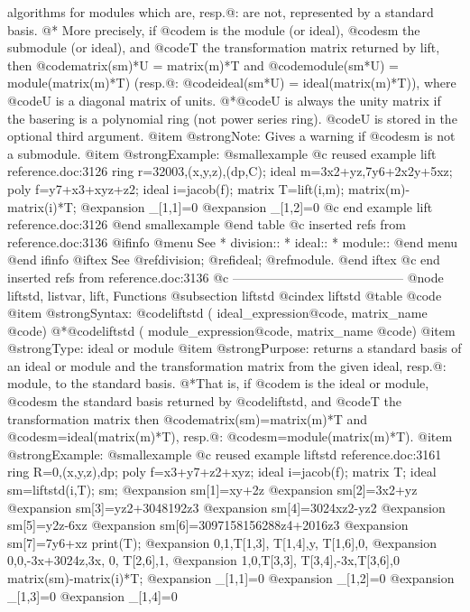 {algorithms for modules which are, resp.@: are not, represented by a
standard basis.
@* More precisely, if  @code{m} is the
module (or ideal), @code{sm} the submodule (or ideal),
and @code{T} the transformation matrix returned by
lift, then @code{matrix(sm)*U = matrix(m)*T}
and @code{module(sm*U) = module(matrix(m)*T)}
(resp.@: @code{ideal(sm*U) = ideal(matrix(m)*T)}),
where @code{U} is a diagonal matrix of units.
@*@code{U} is always the unity matrix if the basering is a polynomial ring
(not power series ring). @code{U} is stored in the optional third argument.
@item @strong{Note:}
Gives a warning if @code{sm} is not a submodule.
@item @strong{Example:}
@smallexample
@c reused example lift reference.doc:3126 
  ring r=32003,(x,y,z),(dp,C);
  ideal m=3x2+yz,7y6+2x2y+5xz;
  poly f=y7+x3+xyz+z2;
  ideal i=jacob(f);
  matrix T=lift(i,m);
  matrix(m)-matrix(i)*T;
@expansion{} _[1,1]=0
@expansion{} _[1,2]=0
@c end example lift reference.doc:3126
@end smallexample
@end table
@c inserted refs from reference.doc:3136
@ifinfo
@menu
See
* division::
* ideal::
* module::
@end menu
@end ifinfo
@iftex
See
@ref{division};
@ref{ideal};
@ref{module}.
@end iftex
@c end inserted refs from reference.doc:3136
@c -----------------------------------------
@node liftstd, listvar, lift, Functions
@subsection liftstd
@cindex liftstd
@table @code
@item @strong{Syntax:}
@code{liftstd (} ideal_expression@code{,} matrix_name @code{)}
@*@code{liftstd (} module_expression@code{,} matrix_name @code{)}
@item @strong{Type:}
ideal or module
@item @strong{Purpose:}
returns a standard basis of an ideal or module and the transformation
matrix from the given ideal, resp.@: module, to the standard basis.
@*That is, if @code{m} is the ideal or module, @code{sm} the standard
basis returned by @code{liftstd}, and @code{T} the transformation matrix
then @code{matrix(sm)=matrix(m)*T} and @code{sm=ideal(matrix(m)*T)},
resp.@: @code{sm=module(matrix(m)*T)}.
@item @strong{Example:}
@smallexample
@c reused example liftstd reference.doc:3161 
  ring R=0,(x,y,z),dp;
  poly f=x3+y7+z2+xyz;
  ideal i=jacob(f);
  matrix T;
  ideal sm=liftstd(i,T);
  sm;
@expansion{} sm[1]=xy+2z
@expansion{} sm[2]=3x2+yz
@expansion{} sm[3]=yz2+3048192z3
@expansion{} sm[4]=3024xz2-yz2
@expansion{} sm[5]=y2z-6xz
@expansion{} sm[6]=3097158156288z4+2016z3
@expansion{} sm[7]=7y6+xz
  print(T);
@expansion{} 0,1,T[1,3],   T[1,4],y,  T[1,6],0,
@expansion{} 0,0,-3x+3024z,3x,    0,  T[2,6],1,
@expansion{} 1,0,T[3,3],   T[3,4],-3x,T[3,6],0 
  matrix(sm)-matrix(i)*T;
@expansion{} _[1,1]=0
@expansion{} _[1,2]=0
@expansion{} _[1,3]=0
@expansion{} _[1,4]=0
}
